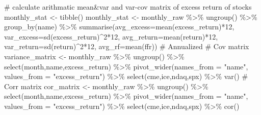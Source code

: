 \documentclass[
  a4paper,
  DIV=11,
  numbers=noendperiod]{scrreprt}
\newenvironment{Shaded}{\begin{snugshade}}{\end{snugshade}}
\newcommand{\AttributeTok}[1]{\textcolor[rgb]{0.40,0.45,0.13}{#1}}
\newcommand{\CommentTok}[1]{\textcolor[rgb]{0.37,0.37,0.37}{#1}}
\newcommand{\DecValTok}[1]{\textcolor[rgb]{0.68,0.00,0.00}{#1}}
\newcommand{\FunctionTok}[1]{\textcolor[rgb]{0.28,0.35,0.67}{#1}}
\newcommand{\NormalTok}[1]{\textcolor[rgb]{0.00,0.23,0.31}{#1}}
\newcommand{\OtherTok}[1]{\textcolor[rgb]{0.00,0.23,0.31}{#1}}
\newcommand{\SpecialCharTok}[1]{\textcolor[rgb]{0.37,0.37,0.37}{#1}}
\newcommand{\StringTok}[1]{\textcolor[rgb]{0.13,0.47,0.30}{#1}}
\begin{document}
\begin{Shaded}
\begin{Highlighting}[]
\CommentTok{\# calculate arithmatic mean\&var and var{-}cov matrix of excess return of stocks}
\NormalTok{monthly\_stat }\OtherTok{\textless{}{-}} \FunctionTok{tibble}\NormalTok{()}
\NormalTok{monthly\_stat }\OtherTok{\textless{}{-}}\NormalTok{ monthly\_raw }\SpecialCharTok{\%\textgreater{}\%} 
  \FunctionTok{ungroup}\NormalTok{() }\SpecialCharTok{\%\textgreater{}\%} 
  \FunctionTok{group\_by}\NormalTok{(name) }\SpecialCharTok{\%\textgreater{}\%} 
  \FunctionTok{summarise}\NormalTok{(}\AttributeTok{avg\_excess=}\FunctionTok{mean}\NormalTok{(excess\_return)}\SpecialCharTok{*}\DecValTok{12}\NormalTok{,}
            \AttributeTok{var\_excess=}\FunctionTok{sd}\NormalTok{(excess\_return)}\SpecialCharTok{\^{}}\DecValTok{2}\SpecialCharTok{*}\DecValTok{12}\NormalTok{,}
            \AttributeTok{avg\_return=}\FunctionTok{mean}\NormalTok{(return)}\SpecialCharTok{*}\DecValTok{12}\NormalTok{,}
            \AttributeTok{var\_return=}\FunctionTok{sd}\NormalTok{(return)}\SpecialCharTok{\^{}}\DecValTok{2}\SpecialCharTok{*}\DecValTok{12}\NormalTok{,}
            \AttributeTok{avg\_rf=}\FunctionTok{mean}\NormalTok{(ffr)) }\CommentTok{\# Annualized}
\CommentTok{\# Cov matrix}
\NormalTok{variance\_matrix }\OtherTok{\textless{}{-}}\NormalTok{ monthly\_raw }\SpecialCharTok{\%\textgreater{}\%} 
  \FunctionTok{ungroup}\NormalTok{() }\SpecialCharTok{\%\textgreater{}\%}
  \FunctionTok{select}\NormalTok{(month,name,excess\_return) }\SpecialCharTok{\%\textgreater{}\%} 
  \FunctionTok{pivot\_wider}\NormalTok{(}\AttributeTok{names\_from =} \StringTok{"name"}\NormalTok{, }\AttributeTok{values\_from =} \StringTok{"excess\_return"}\NormalTok{) }\SpecialCharTok{\%\textgreater{}\%} 
  \FunctionTok{select}\NormalTok{(cme,ice,ndaq,spx) }\SpecialCharTok{\%\textgreater{}\%} 
  \FunctionTok{var}\NormalTok{()}
\CommentTok{\# Corr matrix}
\NormalTok{cor\_matrix }\OtherTok{\textless{}{-}}\NormalTok{ monthly\_raw }\SpecialCharTok{\%\textgreater{}\%} 
  \FunctionTok{ungroup}\NormalTok{() }\SpecialCharTok{\%\textgreater{}\%}
  \FunctionTok{select}\NormalTok{(month,name,excess\_return) }\SpecialCharTok{\%\textgreater{}\%} 
  \FunctionTok{pivot\_wider}\NormalTok{(}\AttributeTok{names\_from =} \StringTok{"name"}\NormalTok{, }\AttributeTok{values\_from =} \StringTok{"excess\_return"}\NormalTok{) }\SpecialCharTok{\%\textgreater{}\%} 
  \FunctionTok{select}\NormalTok{(cme,ice,ndaq,spx) }\SpecialCharTok{\%\textgreater{}\%} 
  \FunctionTok{cor}\NormalTok{()}
\end{Highlighting}
\end{Shaded}
\end{document}
